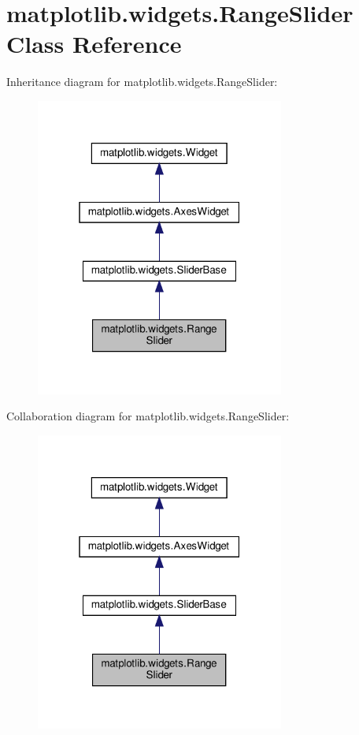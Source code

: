 \hypertarget{classmatplotlib_1_1widgets_1_1RangeSlider}{}\section{matplotlib.\+widgets.\+Range\+Slider Class Reference}
\label{classmatplotlib_1_1widgets_1_1RangeSlider}


Inheritance diagram for matplotlib.\+widgets.\+Range\+Slider\+:
\nopagebreak
\begin{figure}[H]
\begin{center}
\leavevmode
\includegraphics[width=232pt]{classmatplotlib_1_1widgets_1_1RangeSlider__inherit__graph}
\end{center}
\end{figure}


Collaboration diagram for matplotlib.\+widgets.\+Range\+Slider\+:
\nopagebreak
\begin{figure}[H]
\begin{center}
\leavevmode
\includegraphics[width=232pt]{classmatplotlib_1_1widgets_1_1RangeSlider__coll__graph}
\end{center}
\end{figure}
